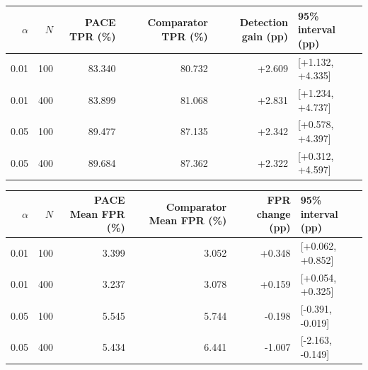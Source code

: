 \begin{tabular}{rrrrrl}
\toprule
$\alpha$ & $N$ & PACE TPR (\%) & Comparator TPR (\%) & Detection gain (pp) & 95\% interval (pp) \\
\midrule
0.01 & 100 & 83.340 & 80.732 & +2.609 & [+1.132, +4.335] \\
0.01 & 400 & 83.899 & 81.068 & +2.831 & [+1.234, +4.737] \\
0.05 & 100 & 89.477 & 87.135 & +2.342 & [+0.578, +4.397] \\
0.05 & 400 & 89.684 & 87.362 & +2.322 & [+0.312, +4.597] \\
\bottomrule
\end{tabular}
\par\medskip
\begin{tabular}{rrrrrl}
\toprule
$\alpha$ & $N$ & PACE Mean FPR (\%) & Comparator Mean FPR (\%) & FPR change (pp) & 95\% interval (pp) \\
\midrule
0.01 & 100 & 3.399 & 3.052 & +0.348 & [+0.062, +0.852] \\
0.01 & 400 & 3.237 & 3.078 & +0.159 & [+0.054, +0.325] \\
0.05 & 100 & 5.545 & 5.744 & -0.198 & [-0.391, -0.019] \\
0.05 & 400 & 5.434 & 6.441 & -1.007 & [-2.163, -0.149] \\
\bottomrule
\end{tabular}
